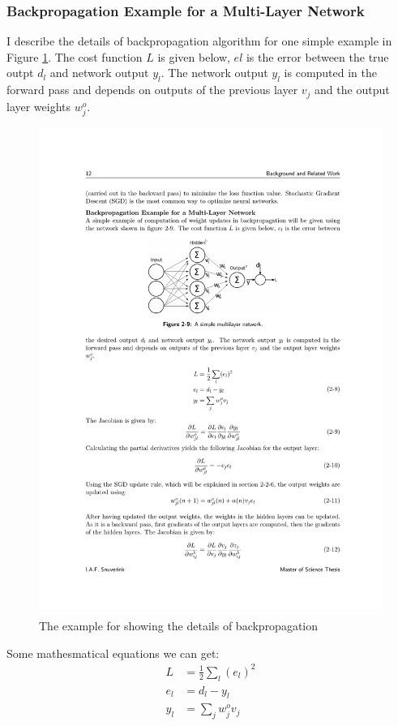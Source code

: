     \subsubsection{Backpropagation Example for a Multi-Layer Network}
    I describe the details of backpropagation algorithm for one simple example in Figure \ref{bp}. The cost function $L$ is given below, $el$ is the error between the true outpt $d_l$ and network output $y_l$. The network output $y_l$ is computed in the forward pass and depends on outputs of the previous layer $v_j$ and the output layer weights $w^{o}_j$.
    \begin{figure}[!h]
        \centering
        \includegraphics{Figures/bp.pdf}
        \caption{The example for showing the details of backpropagation}
        \label{bp}
    \end{figure}
    Some mathesmatical equations we can get:
    \begin{equation}
        \begin{aligned}
            L &= \frac{1}{2} \sum_{l}(e_l)^2 \\
            e_l &= d_l -y_l \\
            y_l &= \sum_{j}w^{o}_j v_j 
        \end{aligned}
        \label{me}
    \end{equation}

